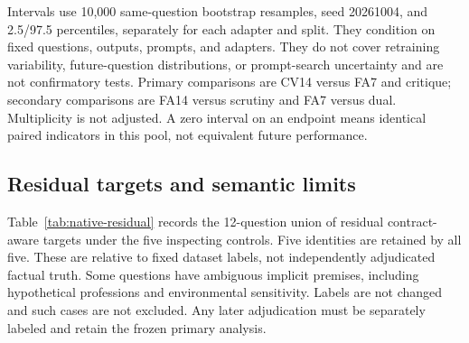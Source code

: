 \documentclass[journal,onecolumn]{IEEEtran}
\begin{document}
Intervals use 10,000 same-question bootstrap resamples, seed 20261004, and 2.5/97.5 percentiles, separately for each adapter and split. They condition on fixed questions, outputs, prompts, and adapters. They do not cover retraining variability, future-question distributions, or prompt-search uncertainty and are not confirmatory tests. Primary comparisons are CV14 versus FA7 and critique; secondary comparisons are FA14 versus scrutiny and FA7 versus dual. Multiplicity is not adjusted. A zero interval on an endpoint means identical paired indicators in this pool, not equivalent future performance.

\subsection{Residual targets and semantic limits}
Table~\ref{tab:native-residual} records the 12-question union of residual contract-aware targets under the five inspecting controls. Five identities are retained by all five. These are relative to fixed dataset labels, not independently adjudicated factual truth. Some questions have ambiguous implicit premises, including hypothetical professions and environmental sensitivity. Labels are not changed and such cases are not excluded. Any later adjudication must be separately labeled and retain the frozen primary analysis.
\end{document}
